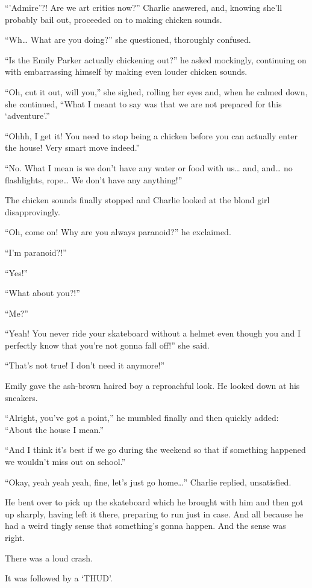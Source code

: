 “’Admire’?! Are we art critics now?” Charlie answered, and, knowing she’ll probably bail out, proceeded on to making chicken sounds.

“Wh… What are you doing?” she questioned, thoroughly confused.

“Is the Emily Parker actually chickening out?” he asked mockingly, continuing on with embarrassing himself by making even louder chicken sounds.

“Oh, cut it out, will you,” she sighed, rolling her eyes and, when he calmed down, she continued, “What I meant to say was that we are not prepared for this ‘adventure’.”

“Ohhh, I get it! You need to stop being a chicken before you can actually enter the house! Very smart move indeed.”

“No. What I mean is we don’t have any water or food with us… and, and… no flashlights, rope… We don’t have any anything!”

The chicken sounds finally stopped and Charlie looked at the blond girl disapprovingly.

“Oh, come on! Why are you always paranoid?” he exclaimed.

“I’m paranoid?!”

“Yes!”

“What about you?!”

“Me?”

“Yeah! You never ride your skateboard without a helmet even though you and I perfectly know that you’re not gonna fall off!” she said.

“That’s not true! I don’t need it anymore!”

Emily gave the ash-brown haired boy a reproachful look. He looked down at his sneakers.

“Alright, you’ve got a point,” he mumbled finally and then quickly added: “About the house I mean.”

“And I think it’s best if we go during the weekend so that if something happened we wouldn’t miss out on school.”

“Okay, yeah yeah yeah, fine, let’s just go home…” Charlie replied, unsatisfied.

He bent over to pick up the skateboard which he brought with him and then got up sharply, having left it there, preparing to run just in case. And all because he had a weird tingly sense that something’s gonna happen. And the sense was right.

There was a loud crash.

It was followed by a ‘THUD’.

